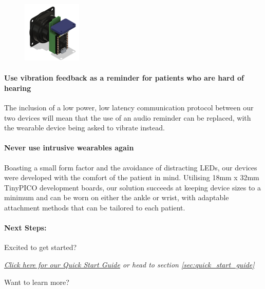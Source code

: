 		\begin{figure}
			\vspace{-1em}
			\centering
			\includegraphics[width=0.25\textwidth]{graphics/hardware.png}
		\end{figure}

		\paragraph{Use vibration feedback as a reminder for patients who are hard of hearing}\mbox{}

		The inclusion of a low power, low latency communication protocol between our two devices will mean that the use of an audio reminder can be replaced, with the wearable device being asked to vibrate instead.

		\newpage

		\paragraph{Never use intrusive wearables again}\mbox{}

		Boasting a small form factor and the avoidance of distracting LEDs, our devices were developed with the comfort of the patient in mind. Utilising 18mm x 32mm TinyPICO development boards, our solution succeeds at keeping device sizes to a minimum and can be worn on either the ankle or wrist, with adaptable attachment methods that can be tailored to each patient.

		\vspace{5em}
		\paragraph{Next Steps:}\mbox{}

		\vspace{1em}
		Excited to get started?

		\textit{\hyperref[sec:quick_start_guide]{Click here for our Quick Start Guide} or head to section \ref{sec:quick_start_guide}}

		\vspace{1em}
		Want to learn more?

